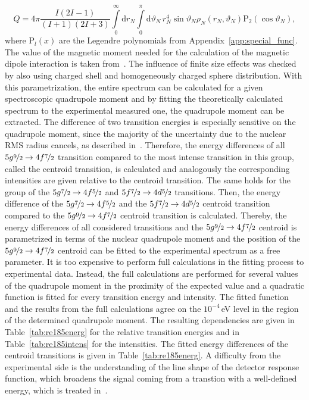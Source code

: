 \begin{equation}
Q = 4\pi\frac{I(2I-1)}{(I+1)(2I+3)}\int\limits_0^\infty\text{d}r_N \int\limits_0^\pi\text{d}\vartheta_N\,
r_N^4 \sin\vartheta_N \rho_N(r_N,\vartheta_N)\text{P}_2(\cos\vartheta_N),
\end{equation}
where $\text{P}_l(x)$ are the Legendre polynomials from Appendix~\ref{app:special_func}.
The value of the magnetic moment needed for the calculation of the magnetic dipole interaction is taken from~\cite{STONE2016}. The influence of finite size effects was checked by also using charged shell and homogeneously charged sphere distribution.
With this parametrization, the entire spectrum can be calculated for a given spectroscopic quadrupole moment and by fitting the theoretically calculated spectrum to the experimental measured one, the quadrupole moment can be extracted. 
The difference of two transition energies is especially sensitive on the quadrupole moment, since the majority of the uncertainty due to the nuclear RMS radius cancels, as described in~\cite{konijn1979}. Therefore, the energy differences of all $5g\nicefrac{9}{2}\rightarrow4f\nicefrac{7}{2}$ transition compared to the most intense transition in this group, called the centroid transition, is calculated and analogously the corresponding intensities are given relative to the centroid transition. 
The same holds for the group of the $5g\nicefrac{7}{2}\rightarrow4f\nicefrac{5}{2}$ and $5f\nicefrac{7}{2}\rightarrow4d\nicefrac{5}{2}$ transitions. Then, the energy difference of the $5g\nicefrac{7}{2}\rightarrow4f\nicefrac{5}{2}$ and the $5f\nicefrac{7}{2}\rightarrow4d\nicefrac{5}{2}$ centroid transition compared to the $5g\nicefrac{9}{2}\rightarrow4f\nicefrac{7}{2}$ centroid transition is calculated. Thereby, the energy differences of all considered transitions and the $5g\nicefrac{9}{2}\rightarrow4f\nicefrac{7}{2}$ centroid is parametrized in terms of the nuclear quadrupole moment and the position of the $5g\nicefrac{9}{2}\rightarrow4f\nicefrac{7}{2}$ centroid can be fitted to the experimental spectrum as a free parameter.
It is too expensive to perform full calculations in the fitting process to experimental data. Instead, the full calculations are performed for several values of the quadrupole moment in the proximity of the expected value and a quadratic function is fitted for every transition energy and intensity. The fitted function and the results from the full calculations agree on the $10^{-4}\,$eV level in the region of the determined quadrupole moment. The resulting dependencies are given in Table~\ref{tab:re185energ} for the relative transition energies and in Table~\ref{tab:re185intens} for the intensities. The fitted energy differences of the centroid transitions is given in Table~\ref{tab:re185energ}. A difficulty from the experimental side is the understanding of the line shape of the detector response function, which broadens the signal coming from a transtion with a well-defined energy, which is treated in~\cite{vogiatzi2018}.

